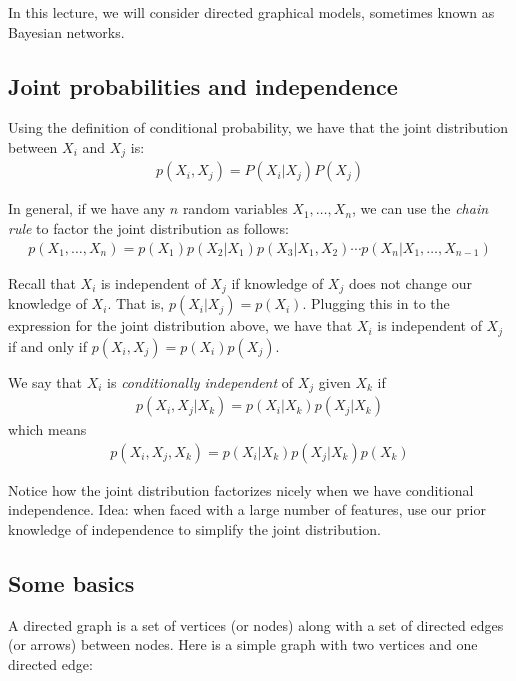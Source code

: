 \documentclass[12pt]{report}
\begin{document}
In this lecture, we will consider directed graphical models, sometimes
known as Bayesian networks. 

\subsection{Joint probabilities and independence}
Using the definition of conditional probability, we have that the
joint distribution between $X_i$ and $X_j$ is:
\begin{align*}
p(X_i,X_j) = P(X_i | X_j)P(X_j)
\end{align*}

In general, if we have any $n$ random variables $X_1,\ldots,X_n$, we can
use the \emph{chain rule} to factor the joint distribution as follows:
\begin{align*}
p(X_1,\ldots,X_n) = p(X_1)p(X_2|X_1)p(X_3|X_1,X_2)\cdots
p(X_n|X_1,\ldots ,X_{n-1})
\end{align*}

Recall that $X_i$ is independent of $X_j$ if knowledge of $X_j$ does
not change our knowledge of $X_i$. That is, $p(X_i | X_j) =
p(X_i)$. Plugging this in to the expression for the joint distribution
above, we have that $X_i$ is independent of $X_j$ if and only if
$p(X_i,X_j)=p(X_i)p(X_j)$.

We say that $X_i$ is \emph{conditionally independent} of $X_j$ given
$X_k$ if
\begin{align*}
p(X_i,X_j|X_k) = p(X_i|X_k)p(X_j|X_k)
\end{align*}
which means
\begin{align*}
p(X_i,X_j,X_k) = p(X_i|X_k)p(X_j|X_k)p(X_k)
\end{align*}

Notice how the joint distribution factorizes nicely when we have
conditional independence. Idea: when faced with a large number of
features, use our prior knowledge of independence to simplify the
joint distribution. 

\subsection{Some basics}
A directed graph is a set of vertices (or nodes) along with a set of
directed edges (or arrows) between nodes. Here is a simple graph with
two vertices and one directed edge:

\begin{center}
\end{center}
\end{document}
